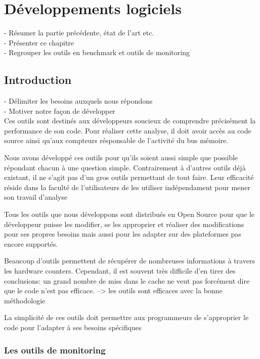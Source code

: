 \chapter{Développements logiciels}\label{chap:dev}
\minitoc


- Résumer la partie précédente, état de l'art etc.\\
- Présenter ce chapitre\\
- Regrouper les outils en benchmark et outils de monitoring\\


\section{Introduction}

- Délimiter les besoins auxquels nous répondons\\
- Motiver notre façon de développer\\

    Ces outils sont destinés aux développeurs soucieux de comprendre précisément la performance de son code. Pour réaliser cette analyse, il doit avoir accès au code source ainsi qu’aux compteurs résponsable de l’activité du bus mémoire.
    
    Nous avons développé ces outils pour qu’ils soient aussi simple que possible répondant chacun à une question simple. Contrairement à d’autres outils déjà existant, il ne s'agit pas d’un gros outils permettant de tout faire. Leur efficacité réside dans la faculté de l’utilisateurs de les utiliser indépendament pour mener son travail d'analyse

    Tous les outils que nous développons sont distribués en Open Source pour que le développeur puisse les modifier, se les approprier et réaliser des modifications pour ses propres besoins mais aussi pour les adapter sur des plateformes pas encore supportés.
    
    Beaucoup d’outils permettent de récupérer de nombreuses informations à travers les hardware counters. Cependant, il est souvent très difficile d’en tirer des conclusions: un grand nombre de miss dans le cache ne veut pas forcément dire que le code n’est pas efficace.
            --> les outils sont efficaces avec la bonne méthodologie
     
    La simplicité de ces outils doit permettre aux programmeurs de s’approprier le code pour l’adapter à ses besoins spécifiques      
    
    
\subsection{Les outils de monitoring}

